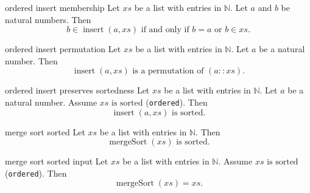 \begin{cleanresult}{ordered insert membership}
Let $\mathit{xs}$ be a list with entries in $\mathbb{N}$.
Let $a$ and $b$ be natural numbers.
Then \[b\in \operatorname{insert}(a,\mathit{xs})\text{ if and only if }b=a\text{ or }b\in \mathit{xs}.\]
\end{cleanresult}

\begin{cleanresult}{ordered insert permutation}
Let $\mathit{xs}$ be a list with entries in $\mathbb{N}$.
Let $a$ be a natural number.
Then \[\operatorname{insert}(a,\mathit{xs})\text{ is a permutation of }(a::\mathit{xs}).\]
\end{cleanresult}

\begin{cleanresult}{ordered insert preserves sortedness}
Let $\mathit{xs}$ be a list with entries in $\mathbb{N}$.
Let $a$ be a natural number.
Assume $\mathit{xs}\text{ is sorted}$ (\texttt{ordered}).
Then \[\operatorname{insert}(a,\mathit{xs})\text{ is sorted}.\]
\end{cleanresult}

\begin{cleanresult}{merge sort sorted}
Let $\mathit{xs}$ be a list with entries in $\mathbb{N}$.
Then \[\operatorname{mergeSort}(\mathit{xs})\text{ is sorted}.\]
\end{cleanresult}

\begin{cleanresult}{merge sort sorted input}
Let $\mathit{xs}$ be a list with entries in $\mathbb{N}$.
Assume $\mathit{xs}\text{ is sorted}$ (\texttt{ordered}).
Then \[\operatorname{mergeSort}(\mathit{xs})=\mathit{xs}.\]
\end{cleanresult}

